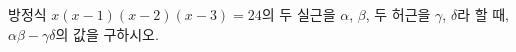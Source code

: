 방정식 $x(x-1)(x-2)(x-3)=24$의 두 실근을 $\alpha$, $\beta$, 두 허근을 $\gamma$, $\delta$라 할 때, $\alpha\beta-\gamma\delta$의 값을 구하시오.
